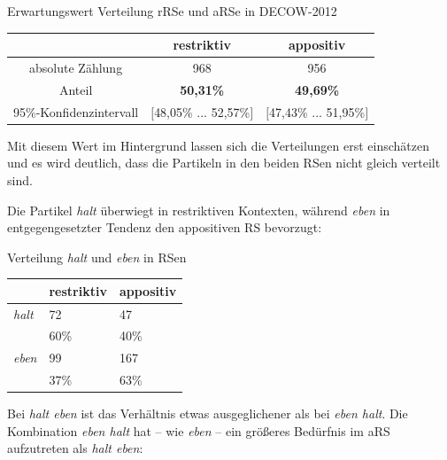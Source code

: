 \begin{exe}
	\ex\label{792}Erwartungswert Verteilung rRSe und aRSe in DECOW-2012\\[-1em]		
 		\begin{tabular}[t]{|c|c|c|} 
 		\hline 	
   	 	& \textbf{restriktiv} & \textbf{appositiv} \\
   	 	\hline 
  		absolute Zählung & 968 & 956\\ 
   		\hline
   		Anteil & \textbf{50,31\%} & \textbf{49,69\%}\\
   		\hline
   		95\%-Konfidenzintervall & $[$48,05\% ... 52,57\%$]$ & $[$47,43\% ... 51,95\%$]$ \\
   		\hline
 		\end{tabular}
\end{exe}
Mit diesem Wert im Hintergrund lassen sich die Verteilungen erst einschätzen und es wird deutlich, dass die Partikeln in den beiden RSen nicht gleich verteilt sind.

Die Partikel \textit{halt} überwiegt in restriktiven Kontexten, während \textit{eben} in entgegengesetzter Tendenz den appositiven RS bevorzugt:

\begin{exe}
	\ex\label{793} Verteilung \textit{halt} und \textit{eben} in RSen\\[-1em]
     \begin{tabular}[t]{|l|l|l|}
     \hline
	 {} & \textbf{restriktiv} & \textbf{appositiv}\\
	 \hline
	 \textit{halt} & 72 & 47\\
	 \hline
	 & 60\% & 40\% \\
	 \hline\hline 
	 \textit{eben} & 99 & 167\\
	 \hline
	 & 37\% & 63\%\\
	 \hline       
     \end{tabular}
\end{exe}
Bei \textit{halt eben} ist das Verhältnis etwas ausgeglichener als bei \textit{eben halt}. Die Kombination \textit{eben halt} hat – wie \textit{eben} – ein größeres Bedürfnis im aRS aufzutreten als \textit{halt eben}:

